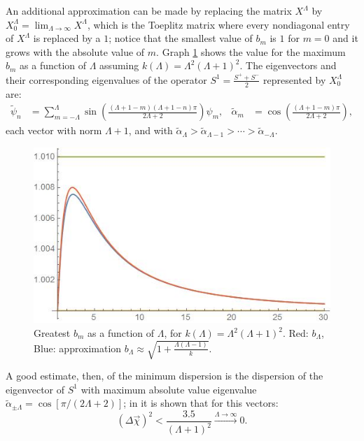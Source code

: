 An additional approximation can be made by replacing the matrix $X^\Lambda$ by $X^\Lambda_0 = \lim_{\Lambda \to \infty} X^\Lambda$, which is the Toeplitz matrix where every nondiagonal entry of $X^\Lambda$ is replaced by a $1$; notice that the smallest value of $b_m$ is $1$ for $m = 0$ and it grows with the absolute value of $m$. Graph \ref{fig:bn} shows the value for the maximum $b_m$ as a function of $\Lambda$ assuming $k(\Lambda) = \Lambda^2(\Lambda+1)^2$. The eigenvectors and their corresponding eigenvalues of the operator $S^1 = \frac{S^+ + S^-}{2}$ represented by $X^\Lambda_0$ are:
\begin{align}
    \tilde \psi_{n} &= \sum_{m = -\Lambda}^\Lambda \sin{\left(\frac{(\Lambda + 1-m)(\Lambda + 1-n)\pi}{2\Lambda + 2}\right)} \psi_m,&
    \tilde \alpha_m &= \cos{\left(\frac{(\Lambda + 1-m)\pi}{2\Lambda + 2}\right)},
\end{align}
each vector with norm $\Lambda + 1$, and with $\tilde \alpha_{\Lambda} > \tilde \alpha_{\Lambda-1} > \cdots > \tilde \alpha_{-\Lambda} $.

\begin{figure}
    \centering
    \includegraphics[width = \textwidth]{images/bn.jpg}
    \caption{Greatest $b_m$ as a function of $\Lambda$, for $k(\Lambda) = \Lambda^2(\Lambda+1)^2$. Red: $b_\Lambda$, Blue: approximation $b_\Lambda \approx \sqrt{1 + \frac{\Lambda(\Lambda - 1)}{k}}$. }
    \label{fig:bn}
\end{figure}

A good estimate, then, of the minimum dispersion is the dispersion of the eigenvector of $S^1$ with maximum absolute value eigenvalue $\tilde \alpha_{\pm \Lambda} = \cos{[\pi/(2\Lambda+2)]}$; in \cite{FioreCoherent2020} it is shown that for this vectors:
\begin{equation}
    (\Delta \vec \chi)^2 < \frac{3.5}{(\Lambda+1)^2} \overset{\Lambda \to \infty}{\longrightarrow} 0.
\end{equation}

